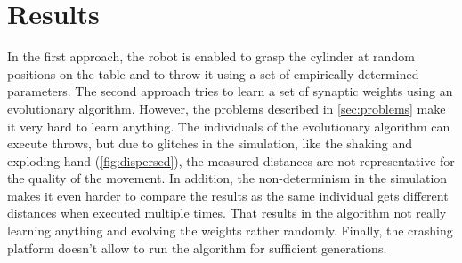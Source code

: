 \section{Results}
\label{sec:results}
In the first approach, the robot is enabled to grasp the cylinder at random positions on the table and to throw it using a set of empirically determined parameters.
The second approach tries to learn a set of synaptic weights using an evolutionary algorithm.
However, the problems described in \autoref{sec:problems} make it very hard to learn anything.
The individuals of the evolutionary algorithm can execute throws, but due to glitches in the simulation, like the shaking and exploding hand (\autoref{fig:dispersed}), the measured distances are not representative for the quality of the movement.
In addition, the non-determinism in the simulation makes it even harder to compare the results as the same individual gets different distances when executed multiple times.
That results in the algorithm not really learning anything and evolving the weights rather randomly.
Finally, the crashing platform doesn't allow to run the algorithm for sufficient generations.
